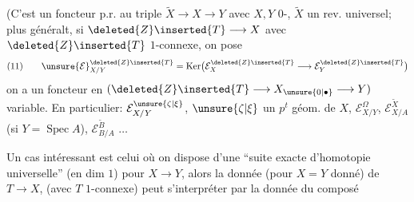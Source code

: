 
(C'est un foncteur p.r. au triple $\widetilde X\longrightarrow X\longrightarrow Y$ avec $X,Y$ $0$-, $\widetilde X$ un rev. universel; plus généralt, si $\deleted{Z}\inserted{T}\longrightarrow X$ avec $\deleted{Z}\inserted{T}$ $1$-connexe, on pose
\[
(11)\qquad \unsure{\mathcal E}_{X/Y}^{\deleted{Z}\inserted{T}}=\operatorname{Ker}\bigl(\mathcal E_X^{\deleted{Z}\inserted{T}}\longrightarrow\mathcal E_Y^{\deleted{Z}\inserted{T}}\bigr)
\]
on a un foncteur en  $(\deleted{Z}\inserted{T}\longrightarrow X_{\unsure{0|\bullet}}\longrightarrow Y)$ variable. En particulier: $\mathcal E_{X/Y}^{\unsure{\zeta|\xi}}$, $\unsure{\zeta|\xi}$ un $p^t$ géom. de $X$, $\mathcal E_{X/Y}^{\Omega}$, $\mathcal E_{X/A}^{\widetilde X}$ (si $Y=\operatorname{Spec} A$), $\mathcal E_{B/A}^{\widetilde B}$ $\ldots$


Un cas intéressant est celui où on dispose d'une ``suite exacte d'homotopie universelle''  (en dim $1$) pour $X\longrightarrow Y$, alors la donnée (pour $X=Y$ donné) de $T\longrightarrow X$, (avec $T$ $1$-connexe) peut s'interpréter par la donnée du composé

